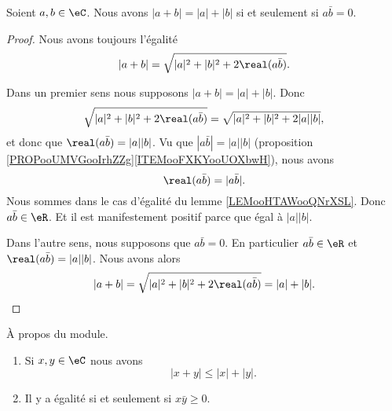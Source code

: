 \begin{lemma}       \label{LEMooHWLXooSkUrGg}
	Soient \( a,b\in \eC\). Nous avons \( | a+b |=| a |+| b |\) si et seulement si \( a\bar b=0\).
\end{lemma}

\begin{proof}
	Nous avons toujours l'égalité
	\begin{equation}
		| a+b |=\sqrt{ | a |^2+| b |^2+2\real(a\bar b) }.
	\end{equation}

	Dans un premier sens nous supposons \( | a+b |=| a |+| b |\). Donc
	\begin{equation}
		\sqrt{ | a |^2+| b |^2+2\real(a\bar b) }=\sqrt{ | a |^2+| b |^2+2| a | |b | },
	\end{equation}
	et donc que \( \real(a\bar b)=| a | |b |\). Vu que \( | a\bar b |=| a | |b |\) (proposition \ref{PROPooUMVGooIrhZZg}\ref{ITEMooFXKYooUOXbwH}), nous avons
	\begin{equation}
		\real(a\bar b)=| a\bar b |.
	\end{equation}
	Nous sommes dans le cas d'égalité du lemme \ref{LEMooHTAWooQNrXSL}. Donc \( a\bar b\in \eR\). Et il est manifestement positif parce que égal à \( | a | |b |\).

	Dans l'autre sens, nous supposons que \( a\bar b=0\). En particulier \( a\bar b\in \eR\) et \( \real(a\bar b)=| a | |b |\). Nous avons alors
	\begin{equation}
		| a+b |=\sqrt{ | a |^2+| b |^2+2\real(a\bar b) }=| a |+| b |.
	\end{equation}
\end{proof}

\begin{lemma}       \label{LEMooRJICooYrcAFv}
	À propos du module.
	\begin{enumerate}
		\item       \label{ITEMooCTHXooHqzuvb}
		      Si \( x,y\in \eC\) nous avons
		      \begin{equation}
			      | x+y |\leq | x |+| y |.
		      \end{equation}
		\item
		      Il y a égalité si et seulement si \( x\bar y\geq 0\).
	\end{enumerate}
\end{lemma}

